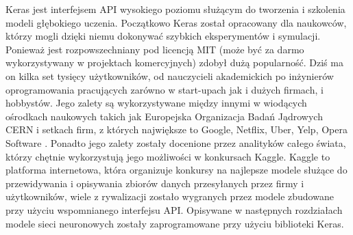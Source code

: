 \documentclass[11pt]{book}
\theoremstyle{definition}
\begin{document}
Keras jest interfejsem API wysokiego poziomu służącym do tworzenia i szkolenia modeli głębokiego uczenia. Początkowo Keras został opracowany dla naukowców, którzy mogli dzięki niemu dokonywać szybkich eksperymentów i symulacji. Ponieważ jest rozpowszechniany pod licencją MIT (może być za darmo wykorzystywany w projektach komercyjnych) zdobył dużą popularność. Dziś ma on kilka set tysięcy użytkowników, od nauczycieli akademickich po inżynierów oprogramowania pracujących zarówno w start-upach jak i dużych firmach, i hobbystów. Jego zalety są wykorzystywane między innymi w wiodących ośrodkach naukowych takich jak Europejska Organizacja Badań Jądrowych CERN i setkach firm, z których największe to Google, Netflix, Uber, Yelp, Opera Software \cite{Chollet:2017}. Ponadto jego zalety zostały docenione przez analityków całego świata, którzy chętnie wykorzystują jego możliwości w konkursach Kaggle. Kaggle to platforma internetowa, która organizuje konkursy na najlepsze modele służące do przewidywania i opisywania zbiorów danych przesyłanych przez firmy i użytkowników, wiele z rywalizacji zostało wygranych przez modele zbudowane przy użyciu wspomnianego interfejsu API. Opisywane w następnych rozdziałach modele sieci neuronowych zostały zaprogramowane przy użyciu biblioteki Keras.
%
\end{document}

